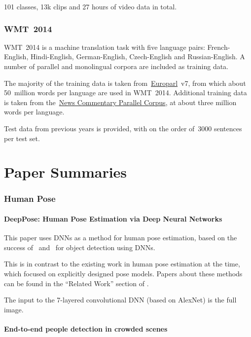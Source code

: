 \documentclass[a4paper, 12pt]{article}
\begin{document}
101 classes, 13k clips and 27 hours of video data in total.


\section{WMT~2014~\citet{wmt14-translation-website}}
\label{wmt2014}

WMT~2014 is a machine translation task with five language pairs:
French-English, Hindi-English, German-English, Czech-English and
Russian-English. A number of parallel and monolingual corpora are included as
training data.

The majority of the training data is taken
from~\href{http://www.statmt.org/europarl/}{Europarl}~v7, from which about
50~million words per language are used in WMT~2014. Additional training data is
taken from the~\href{http://www.casmacat.eu/corpus/news-commentary.html}{News
Commentary Parallel Corpus}, at about three million words per language.

Test data from previous years is provided, with on the order of~\num{3000}
sentences per test set.


\part{Paper Summaries}


\section{Human Pose}


\subsection{DeepPose: Human Pose Estimation via Deep Neural
            Networks\citet{DBLP:journals/corr/ToshevS13}}

This paper uses DNNs as a method for human pose estimation, based on the
success of~\citet{NIPS2013_5207} and~\citet{DBLP:journals/corr/GirshickDDM13} for
object detection using DNNs.

This is in contrast to the existing work in human pose estimation at the time,
which focused on explicitly designed pose models. Papers about these methods
can be found in the ``Related Work'' section of
\citet{DBLP:journals/corr/ToshevS13}.

The input to the 7-layered convolutional DNN (based on
AlexNet\citet{NIPS2012_4824}) is the full image.


\subsection{End-to-end people detection in crowded
            scenes\citet{DBLP:journals/corr/StewartA15}}
\end{document}
